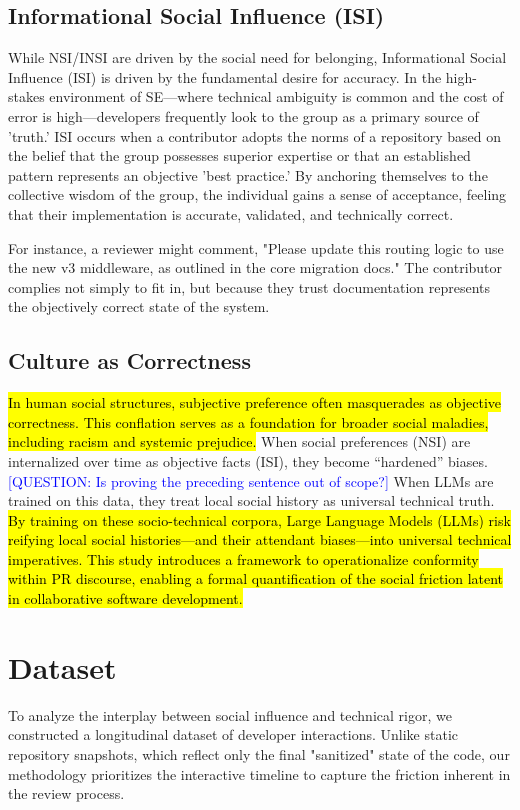 \documentclass[10pt]{article}
\newcommand{\question}[1]{\textcolor{blue}{[QUESTION: #1]}}
\begin{document}
\subsection{Informational Social Influence (ISI)}
While NSI/INSI are driven by the social need for belonging, Informational Social Influence (ISI) is driven by the fundamental desire for accuracy\cite{deutsch1955study}. In the high-stakes environment of SE—where technical ambiguity is common and the cost of error is high—developers frequently look to the group as a primary source of 'truth.' ISI occurs when a contributor adopts the norms of a repository based on the belief that the group possesses superior expertise or that an established pattern represents an objective 'best practice.' By anchoring themselves to the collective wisdom of the group, the individual gains a sense of acceptance, feeling that their implementation is accurate, validated, and technically correct.

For instance, a reviewer might comment, "Please update this routing logic to use the new v3 middleware, as outlined in the core migration docs." The contributor complies not simply to fit in, but because they trust documentation represents the objectively correct state of the system.

\subsection{Culture as Correctness}
\hl{In human social structures, subjective preference often masquerades as objective correctness. This conflation serves as a foundation for broader social maladies, including racism and systemic prejudice.} When social preferences (NSI) are internalized over time as objective facts (ISI), they become ``hardened'' biases. \question{Is proving the preceding sentence out of scope?} When LLMs are trained on this data, they treat local social history as universal technical truth. \hl{By training on these socio-technical corpora, Large Language Models (LLMs) risk reifying local social histories—and their attendant biases—into universal technical imperatives. This study introduces a framework to operationalize conformity within PR discourse, enabling a formal quantification of the social friction latent in collaborative software development.}

\section{Dataset}
To analyze the interplay between social influence and technical rigor, we constructed a longitudinal dataset of developer interactions. Unlike static repository snapshots, which reflect only the final "sanitized" state of the code, our methodology prioritizes the interactive timeline to capture the friction inherent in the review process.
\end{document}
